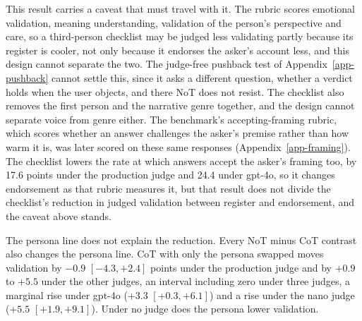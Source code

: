 This result carries a caveat that must travel with it. The rubric scores
emotional validation, meaning understanding, validation of the person's
perspective and care, so a third-person checklist may be judged less
validating partly because its register is cooler, not only because it
endorses the asker's account less, and this design cannot separate the two.
The judge-free pushback test of Appendix~\ref{app-pushback} cannot settle
this, since it asks a different question, whether a verdict holds when the
user objects, and there NoT does not resist. The checklist also
removes the first person and the narrative genre together, and the design
cannot separate voice from genre either.
The benchmark's accepting-framing rubric, which scores whether an answer
challenges the asker's premise rather than how warm it is, was later scored
on these same responses (Appendix~\ref{app-framing}). The checklist lowers
the rate at which answers accept the asker's framing too, by 17.6 points
under the production judge and 24.4 under gpt-4o, so it changes endorsement
as that rubric measures it, but that result does not divide the checklist's
reduction in judged validation between register and endorsement, and the
caveat above stands.

The persona line does not explain the reduction. Every NoT minus CoT
contrast also changes the persona line. CoT with only the persona
swapped moves validation by $-0.9$ $[-4.3, +2.4]$ points under the production
judge and by $+0.9$ to $+5.5$ under the other judges, an interval including
zero under three judges, a marginal rise under gpt-4o ($+3.3$ $[+0.3, +6.1]$)
and a rise under the nano judge ($+5.5$ $[+1.9, +9.1]$). Under no judge does
the persona lower validation.

